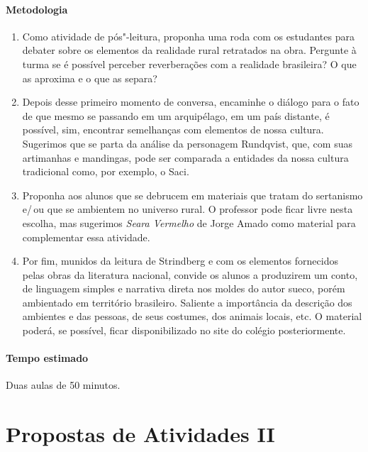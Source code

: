 \documentclass[12pt]{extarticle}
\begin{document}
\paragraph{Metodologia}

\begin{enumerate}
\item
Como atividade de pós"-leitura, proponha uma roda com os estudantes para 
debater sobre os elementos da realidade rural retratados na obra. Pergunte 
à turma se é possível perceber reverberações com a realidade brasileira? 
O que as aproxima e o que as separa? 

\item
Depois desse primeiro momento de conversa, encaminhe o diálogo para o fato 
de que mesmo se passando em um arquipélago, em um país distante, é possível, 
sim, encontrar semelhanças com elementos de nossa cultura. 
Sugerimos que se parta da análise da personagem Rundqvist, que, com suas 
artimanhas e mandingas, pode ser comparada a entidades da nossa cultura 
tradicional como, por exemplo, o Saci. 

\item
Proponha aos alunos que se debrucem em materiais que tratam do
sertanismo e/\,ou que se ambientem no universo rural. 
O professor pode ficar livre nesta escolha, mas sugerimos 
\emph{Seara Vermelho} de Jorge Amado como material 
para complementar essa atividade. 

\item
Por fim, munidos da leitura de Strindberg e com os elementos fornecidos 
pelas obras da literatura nacional, convide os alunos a produzirem um 
conto, de linguagem simples e narrativa direta nos moldes do autor sueco, 
porém ambientado em território brasileiro. 
Saliente a importância da descrição dos ambientes e das pessoas, de seus 
costumes, dos animais locais, etc. O material poderá, se possível, ficar disponibilizado no site do colégio posteriormente.
\end{enumerate}

\paragraph{Tempo estimado} Duas aulas de 50 minutos.


\section{Propostas de Atividades II}
\end{document}
